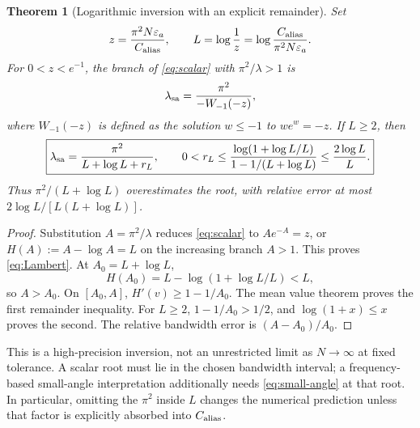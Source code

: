 \documentclass[11pt]{article}
\newtheorem{theorem}{Theorem}[section]
\theoremstyle{definition}\newtheorem{definition}[theorem]{Definition}
\theoremstyle{remark}\newtheorem{remark}[theorem]{Remark}
\numberwithin{equation}{section}
\begin{document}
\begin{theorem}[Logarithmic inversion with an explicit remainder]
\label{thm:log}
Set
\begin{equation}
 z=\frac{\pi^2N\varepsilon_a}{C_{\rm alias}},\qquad
 L=\log\frac1z=\log\frac{C_{\rm alias}}{\pi^2N\varepsilon_a}.
 \label{eq:L}
\end{equation}
For $0<z<e^{-1}$, the branch of \eqref{eq:scalar} with $\pi^2/\lambda>1$ is
\begin{equation}
 \lambda_{\rm sa}=\frac{\pi^2}{-W_{-1}(-z)},
 \label{eq:Lambert}
\end{equation}
where $W_{-1}(-z)$ is defined as the solution $w\le-1$ to $we^w=-z$. If $L\ge2$, then
\begin{equation}
 \boxed{\lambda_{\rm sa}=\frac{\pi^2}{L+\log L+r_L},\qquad
 0<r_L\le\frac{\log(1+\log L/L)}{1-1/(L+\log L)}
 \le\frac{2\log L}{L}.}
 \label{eq:log-root}
\end{equation}
Thus $\pi^2/(L+\log L)$ overestimates the root, with relative error at most
$2\log L/[L(L+\log L)]$.
\end{theorem}
\begin{proof}
Substitution $A=\pi^2/\lambda$ reduces \eqref{eq:scalar} to
$Ae^{-A}=z$, or $H(A):=A-\log A=L$ on the increasing branch $A>1$. This proves \eqref{eq:Lambert}. At $A_0=L+\log L$,
\[
 H(A_0)=L-\log(1+\log L/L)<L,
\]
so $A>A_0$. On $[A_0,A]$, $H'(v)\ge1-1/A_0$. The mean value theorem proves the first remainder inequality. For $L\ge2$, $1-1/A_0>1/2$, and $\log(1+x)\le x$ proves the second. The relative bandwidth error is $(A-A_0)/A_0$.
\end{proof}
This is a high-precision inversion, not an unrestricted limit as $N\to\infty$ at fixed tolerance. A scalar root must lie in the chosen bandwidth interval; a frequency-based small-angle interpretation additionally needs \eqref{eq:small-angle} at that root. In particular, omitting the $\pi^2$ inside $L$ changes the numerical prediction unless that factor is explicitly absorbed into $C_{\rm alias}$.
\end{document}
